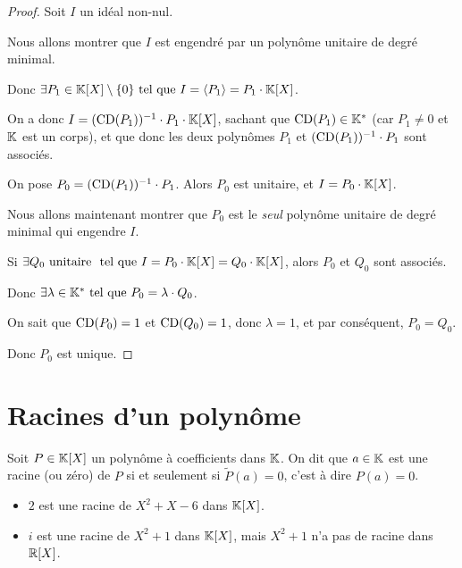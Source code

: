 \documentclass[12pt, a4paper]{report}
\begin{document}
\begin{proof}
    Soit $I$ un idéal non-nul.

    Nous allons montrer que $I$ est engendré par un polynôme unitaire de degré minimal.
    
    Donc $\exists P_1 \in \mathbb{K}[X] \setminus \{0\} \text{ tel que } I = \langle P_1 \rangle = P_1 \cdot \mathbb{K}[X]$.

    On a donc $I = (\mathrm{CD}(P_1))^{-1} \cdot P_1 \cdot \mathbb{K}[X]$, sachant que $\mathrm{CD}(P_1) \in \mathbb{K}^*$ (car $P_1 \ne 0$ et $\mathbb{K}$ est un corps), et que donc les deux polynômes $P_1$ et $(\mathrm{CD}(P_1))^{-1} \cdot P_1$ sont associés.

    On pose $P_0 = (\mathrm{CD}(P_1))^{-1} \cdot P_1$. Alors $P_0$ est unitaire, et $I = P_0 \cdot \mathbb{K}[X]$.

    Nous allons maintenant montrer que $P_0$ est le \textit{seul} polynôme unitaire de degré minimal qui engendre $I$.

    Si $\exists Q_0 \text{ unitaire } \text{ tel que } I = P_0 \cdot \mathbb{K}[X] = Q_0 \cdot \mathbb{K}[X]$, alors $P_0$ et $Q_0$ sont associés.

    Donc $\exists \lambda \in \mathbb{K}^* \text{ tel que } P_0 = \lambda \cdot Q_0$.

    On sait que $\mathrm{CD}(P_0) = 1$ et $\mathrm{CD}(Q_0) = 1$, donc $\lambda = 1$, et par conséquent, $P_0 = Q_0$.

    Donc $P_0$ est unique.
\end{proof}

\section{Racines d'un polynôme}

\begin{definition}
    Soit $P \in \mathbb{K}[X]$ un polynôme à coefficients dans $\mathbb{K}$. On dit que $a \in \mathbb{K}$ est une racine (ou zéro) de $P$ si et seulement si $\tilde P(a) = 0$, c'est à dire $P(a) = 0$.
\end{definition}

\begin{example}
    \begin{itemize}
        \item $2$ est une racine de $X^2 + X - 6$ dans $\mathbb{K}[X]$.
        \item $i$ est une racine de $X^2 + 1$ dans $\mathbb{K}[X]$, mais $X^2 + 1$ n'a pas de racine dans $\mathbb{R}[X]$.
    \end{itemize}
\end{example}
\end{document}

